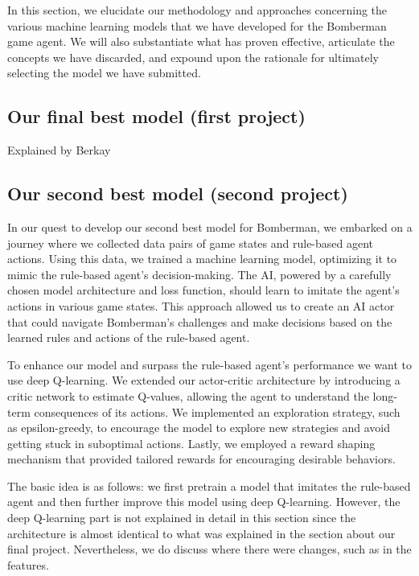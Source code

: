 In this section, we elucidate our methodology and approaches concerning the various machine learning models 
that we have developed for the Bomberman game agent. We will also substantiate what has proven effective, articulate 
the concepts we have discarded, and expound upon the rationale for ultimately selecting the model we have submitted.

\subsection{Our final best model (first project)}

Explained by Berkay

\subsection{Our second best model (second project)}

In our quest to develop our second best model for Bomberman, we embarked on a journey where we collected data pairs of game 
states and rule-based agent actions. Using this data, we trained a machine learning model, optimizing it to mimic 
the rule-based agent's decision-making. The AI, powered by a carefully chosen model architecture and loss function, 
should learn to imitate the agent's actions in various game states. This approach allowed us to create an AI actor 
that could navigate Bomberman's challenges and make decisions based on the learned rules and actions of the rule-based agent.

To enhance our model and surpass the rule-based agent's performance we want to use deep Q-learning. We extended our actor-critic architecture by 
introducing a critic network to estimate Q-values, allowing the agent to understand the long-term consequences of its actions. 
We implemented an exploration strategy, such as epsilon-greedy, to encourage the model to explore new strategies and avoid getting 
stuck in suboptimal actions. Lastly, we employed a reward shaping mechanism that provided tailored rewards for encouraging desirable behaviors.

The basic idea is as follows: we first pretrain a model that imitates the rule-based agent and then further improve this model using deep Q-learning. 
However, the deep Q-learning part is not explained in detail in this section since the architecture is almost identical to what was explained in the 
section about our final project. Nevertheless, we do discuss where there were changes, such as in the features.

